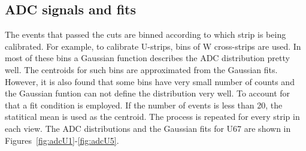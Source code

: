 \subsection{ADC signals and fits}
The events that passed the cuts are binned according to which strip is being calibrated. For example, to calibrate U-strips, bins of W
cross-strips are used. In most of these bins a Gaussian function describes the ADC distribution pretty well. The centroids for such bins
are approximated from the Gaussian fits. However, it is also found that some bins have very small number of counts and the Gaussian
funtion can not define the distribution very well. To account for that a fit condition is employed. If the number of events is less 
than 20, the statitical mean is used as the centroid. The process is repeated for every strip in each view. The ADC distributions and the Gaussian
fits for U67 are shown in Figures~\ref{fig:adcU1}-\ref{fig:adcU5}.
